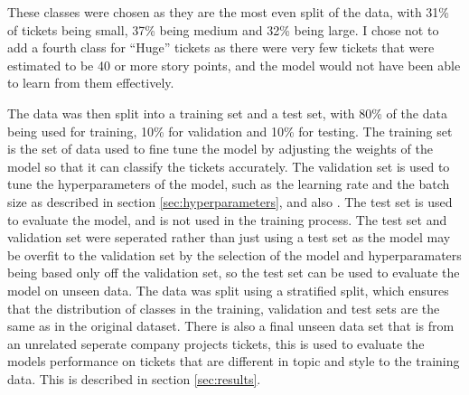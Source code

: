 \documentclass{UoYCSproject}
\begin{document}
    These classes were chosen as they are the most even split of the data, with 31\% of tickets being small, 37\% being medium and 32\% being large. I chose not to add a fourth class for ``Huge'' tickets as there were very few tickets that were estimated to be 40 or more story points, and the model would not have been able to learn from them effectively.

    The data was then split into a training set and a test set, with 80\% of the data being used for training, 10\% for validation and 10\% for testing.
    The training set is the set of data used to fine tune the model by adjusting the weights of the model so that it can classify the tickets accurately.
    The validation set is used to tune the hyperparameters of the model, such as the learning rate and the batch size as described in section \ref{sec:hyperparameters}, and also .
    The test set is used to evaluate the model, and is not used in the training process.
    The test set and validation set were seperated rather than just using a test set as the model may be overfit to the validation set by the selection of the model and hyperparamaters being based only off the validation set, so the test set can be used to evaluate the model on unseen data.
    The data was split using a stratified split, which ensures that the distribution of classes in the training, validation and test sets are the same as in the original dataset.
    There is also a final unseen data set that is from an unrelated seperate company projects tickets, this is used to evaluate the models performance on tickets that are different in topic and style to the training data. This is described in section \ref{sec:results}.


%
\end{document}
